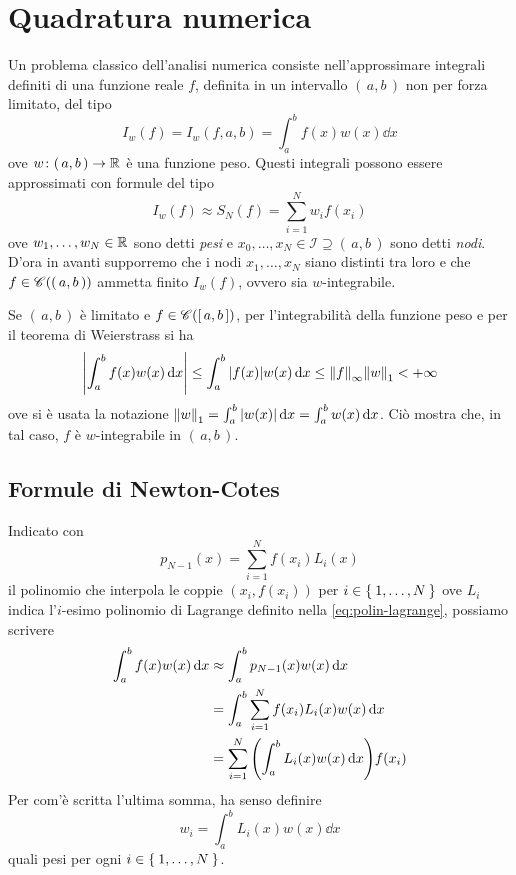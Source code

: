 \chapter{Quadratura numerica}

	\noindent Un problema classico dell'analisi numerica consiste nell'approssimare integrali definiti di una funzione reale \(f\), definita in un intervallo \((\, a, b \,)\) non per forza limitato, del tipo
	\begin{equation}\label{eq:integrale-con-peso}
		I_w (f) = I_w (f, a, b) = \int_a^b f (x) w (x) \dd{x}
	\end{equation}
	ove \(w \colon (\, a, b \,) \to \mathbb{R}\) è una funzione peso. Questi integrali possono essere approssimati con formule del tipo
	\begin{equation}\label{eq:formula-quadratura}
		I_w (f) \approx S_N (f) = \sum_{i = 1}^N w_i f (x_i)
	\end{equation}
	ove \(w_1, \dots, w_N \in \mathbb{R}\) sono detti \emph{pesi} e \(x_0, \dots, x_N \in \mathcal{I} \supseteq (\, a, b \,)\) sono detti \emph{nodi}. D'ora in avanti supporremo che i nodi \(x_1, \dots, x_N\) siano distinti tra loro e che \(f \in \mathscr{C} ((\, a, b \,))\) ammetta finito \(I_w (f)\), ovvero sia \(w\)-integrabile.
	
	Se \((\, a, b \,)\) è limitato e \(f \in \mathscr{C} ([\, a, b \,])\), per l'integrabilità della funzione peso e per il teorema di Weierstrass si ha
	\begin{equation*}
		\abs{\int_a^b f (x) w (x) \dd{x}} \le \int_a^b \abs{f (x)} w (x) \dd{x} \le \norm{f}_\infty \norm{w}_1 < + \infty
	\end{equation*}
	ove si è usata la notazione \(\norm{w}_1 = \int_a^b \abs{w (x)} \dd{x} = \int_a^b w (x) \dd{x}\). Ciò mostra che, in tal caso, \(f\) è \(w\)-integrabile in \((\, a, b \,)\).
	
\section{Formule di Newton-Cotes}
	
	\noindent Indicato con
	\begin{equation*}
		p_{N - 1} (x) = \sum_{i = 1}^N f (x_i) L_i (x)
	\end{equation*}
	il polinomio che interpola le coppie \((x_i, f (x_i))\) per \(i \in \Set{1, \dots, N}\) ove \(L_i\) indica l'\(i\)-esimo polinomio di Lagrange definito nella \eqref{eq:polin-lagrange}, possiamo scrivere
	\begin{equation*}
		\begin{split}
			\int_a^b f (x) w (x) \dd{x} &\approx \int_a^b p_{N - 1} (x) w (x) \dd{x} \\
			&= \int_a^b \sum_{i = 1}^N f (x_i) L_i (x) w (x) \dd{x} \\
			&= \sum_{i = 1}^N \qty(\int_a^b L_i (x) w (x) \dd{x}) f (x_i)
		\end{split}
	\end{equation*}
	Per com'è scritta l'ultima somma, ha senso definire
	\begin{equation*}
		w_i = \int_a^b L_i (x) w (x) \dd{x}
	\end{equation*}
	quali pesi per ogni \(i \in \Set{1, \dots, N}\).
	
